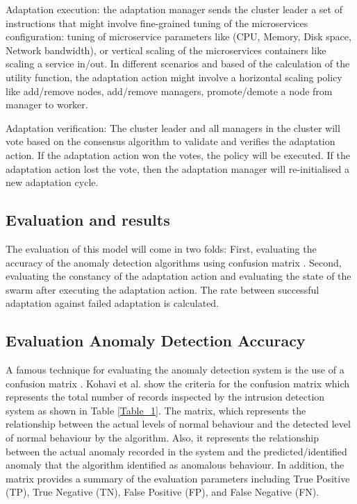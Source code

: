 \documentclass[sigconf]{acmart}
\begin{document}
Adaptation execution: the adaptation manager sends the cluster leader a set of instructions that might involve fine-grained tuning of the microservices configuration: tuning of microservice parameters like (CPU, Memory, Disk space, Network bandwidth), or vertical scaling of the microservices containers like scaling a service in/out. In different scenarios and based of the calculation of the utility function, the adaptation action might involve a horizontal scaling policy like add/remove nodes, add/remove managers, promote/demote a node from manager to worker. 

Adaptation verification: The cluster leader and all managers in the cluster will vote based on the consensus algorithm to validate and verifies the adaptation action. If the adaptation action won the votes, the policy will be executed. If the adaptation action lost the vote, then the adaptation manager will re-initialised a new adaptation cycle.  
 

\subsection{Evaluation and results} 
\label{sec:evaluation}
The evaluation of this model will come in two folds: First, evaluating the accuracy of the anomaly detection algorithms using confusion matrix \cite{kohavi1998confusion}.
Second, evaluating the constancy of the adaptation action and evaluating the state of the swarm after executing the adaptation action. The rate between successful adaptation against failed adaptation is calculated. 

\subsection{Evaluation Anomaly Detection Accuracy}
A famous technique for evaluating the anomaly detection system is the use of a confusion matrix \cite{kohavi1998confusion}. Kohavi et al. \cite{kohavi1998confusion} show the criteria for the confusion matrix which represents the total number of records inspected by the intrusion detection system as shown in Table \ref{Table_1}. The matrix, which represents the relationship between the actual levels of normal behaviour and the detected level of normal behaviour by the algorithm. Also, it represents the relationship between the actual anomaly recorded in the system and the predicted/identified anomaly that the algorithm identified as anomalous behaviour.  In addition, the matrix provides a summary of the evaluation parameters including True Positive (TP), True Negative (TN), False Positive (FP), and False Negative (FN).  
 
\end{document}
